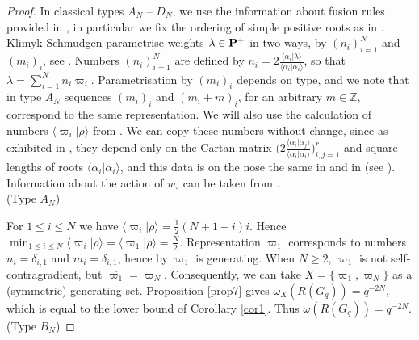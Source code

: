 \documentclass[11 pt, leqno]{amsart}
\newcommand{\ov}{\overline}
\newcommand{\la}{\langle}
\newcommand{\ra}{\rangle}
\newcommand{\ZZ}{\mathbb{Z}}
\theoremstyle{definition}
\numberwithin{equation}{section}
\begin{document}
\begin{proof}
In classical types $A_N$ -- $D_N$, we use the information about fusion rules provided in \cite{KlimykSchmudgen}, in particular we fix the ordering of simple positive roots as in \cite{KlimykSchmudgen}. Klimyk-Schmudgen parametrise weights $\lambda\in \bf{P}^+$ in two ways, by $(n_i)_{i=1}^{N}$ and $(m_i)_i$, see \cite[Page 201]{KlimykSchmudgen}. Numbers $(n_i)_{i=1}^{N}$ are defined by $n_i=2\tfrac{\la\alpha_i| \lambda \ra }{\la \alpha_i|\alpha_i\ra}$, so that $\lambda=\sum_{i=1}^{N} n_i\varpi_i$. Parametrisation by $(m_i)_i$ depends on type, and we note that in type $A_N$ sequences $(m_i)_i$ and $(m_i+m)_i$, for an arbitrary $m\in\ZZ$, correspond to the same representation. We will also use the calculation of numbers $\la \varpi_i|\rho\ra$ from \cite{KrajczokSoltan}. We can copy these numbers without change, since as exhibited in \cite[Equation $(4.22)$]{KrajczokSoltan}, they depend only on the Cartan matrix $\bigl(2 \tfrac{\la\alpha_i|\alpha_j\ra}{\la\alpha_i|\alpha_i\ra}\bigr)_{i,j=1}^{r}$ and square-lengths of roots $\la\alpha_i|\alpha_i\ra$, and this data is on the nose the same in \cite{KrajczokSoltan} and in \cite{KlimykSchmudgen} (see \cite[Page 159]{KlimykSchmudgen}). Information about the action of $w_\circ$ can be taken from \cite[Page 265 -- 273]{BourbakiLie4-6}.\\

(Type $A_N$) 

For $1\le i \le N$ we have $\la \varpi_i |\rho\ra =\tfrac{1}{2}(N+1-i)i$. Hence $\min_{1 \le i \le N}\la \varpi_i|\rho\ra = \la\varpi_1|\rho\ra=\tfrac{N}{2}$. Representation $\varpi_1$ corresponds to numbers $n_i=\delta_{i,1}$ and $m_i=\delta_{i,1}$, hence by \cite[Equation $(13)$, page 210]{KlimykSchmudgen} $\varpi_1$ is generating. When $N\ge 2$, $\varpi_1$ is not self-contragradient, but $\ov{\varpi_1}=\varpi_N$. Consequently, we can take $X=\{\varpi_1,\varpi_N\}$ as a (symmetric) generating set. Proposition \ref{prop7} gives $\omega_X(R(G_q))=q^{-2N}$, which is equal to the lower bound of Corollary \ref{cor1}. Thus $\omega(R(G_q))=q^{-2N}$.\\

(Type $B_N$) 


\end{proof}
\end{document}
